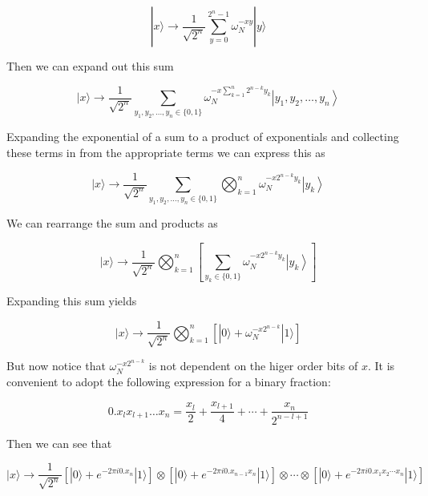 \documentclass[10pt]{article}
\begin{document}
\begin{equation*}
|x\rangle \rightarrow \frac{1}{\sqrt{2^{n}}} \sum_{y=0}^{2^{n}-1} \omega_{N}^{-x y}|y\rangle \tag{22}
\end{equation*}


Then we can expand out this sum


\begin{equation*}
|x\rangle \rightarrow \frac{1}{\sqrt{2^{n}}} \sum_{y_{1}, y_{2}, \ldots, y_{n} \in\{0,1\}} \omega_{N}^{-x \sum_{k=1}^{n} 2^{n-k} y_{k}}\left|y_{1}, y_{2}, \ldots, y_{n}\right\rangle \tag{23}
\end{equation*}


Expanding the exponential of a sum to a product of exponentials and collecting these terms in from the appropriate terms we can express this as


\begin{equation*}
|x\rangle \rightarrow \frac{1}{\sqrt{2^{n}}} \sum_{y_{1}, y_{2}, \ldots, y_{n} \in\{0,1\}} \bigotimes_{k=1}^{n} \omega_{N}^{-x 2^{n-k} y_{k}}\left|y_{k}\right\rangle \tag{24}
\end{equation*}


We can rearrange the sum and products as


\begin{equation*}
|x\rangle \rightarrow \frac{1}{\sqrt{2^{n}}} \bigotimes_{k=1}^{n}\left[\sum_{y_{k} \in\{0,1\}} \omega_{N}^{-x 2^{n-k} y_{k}}\left|y_{k}\right\rangle\right] \tag{25}
\end{equation*}


Expanding this sum yields


\begin{equation*}
|x\rangle \rightarrow \frac{1}{\sqrt{2^{n}}} \bigotimes_{k=1}^{n}\left[|0\rangle+\omega_{N}^{-x 2^{n-k}}|1\rangle\right] \tag{26}
\end{equation*}


But now notice that $\omega_{N}^{-x 2^{n-k}}$ is not dependent on the higer order bits of $x$. It is convenient to adopt the following expression for a binary fraction:


\begin{equation*}
0 . x_{l} x_{l+1} \ldots x_{n}=\frac{x_{l}}{2}+\frac{x_{l+1}}{4}+\cdots+\frac{x_{n}}{2^{n-l+1}} \tag{27}
\end{equation*}


Then we can see that


\begin{equation*}
|x\rangle \rightarrow \frac{1}{\sqrt{2^{n}}}\left[|0\rangle+e^{-2 \pi i 0 . x_{n}}|1\rangle\right] \otimes\left[|0\rangle+e^{-2 \pi i 0 . x_{n-1} x_{n}}|1\rangle\right] \otimes \cdots \otimes\left[|0\rangle+e^{-2 \pi i 0 . x_{1} x_{2} \cdots x_{n}}|1\rangle\right] \tag{28}
\end{equation*}
\end{document}
